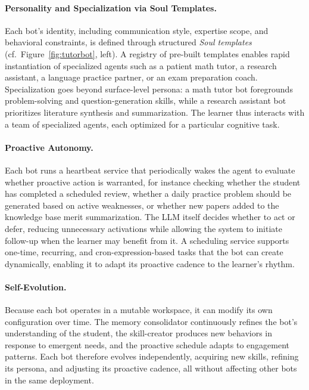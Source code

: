 \paragraph{Personality and Specialization via Soul Templates.}
Each bot's identity, including communication style, expertise scope, and behavioral constraints, is defined through structured \emph{Soul templates} (cf.\ Figure~\ref{fig:tutorbot}, left).
A registry of pre-built templates enables rapid instantiation of specialized agents such as a patient math tutor, a research assistant, a language practice partner, or an exam preparation coach.
Specialization goes beyond surface-level persona: a math tutor bot foregrounds problem-solving and question-generation skills, while a research assistant bot prioritizes literature synthesis and summarization.
The learner thus interacts with a team of specialized agents, each optimized for a particular cognitive task.

\paragraph{Proactive Autonomy.}
Each bot runs a heartbeat service that periodically wakes the agent to evaluate whether proactive action is warranted, for instance checking whether the student has completed a scheduled review, whether a daily practice problem should be generated based on active weaknesses, or whether new papers added to the knowledge base merit summarization.
The LLM itself decides whether to act or defer, reducing unnecessary activations while allowing the system to initiate follow-up when the learner may benefit from it.
A scheduling service supports one-time, recurring, and cron-expression-based tasks that the bot can create dynamically, enabling it to adapt its proactive cadence to the learner's rhythm.

\paragraph{Self-Evolution.}
Because each bot operates in a mutable workspace, it can modify its own configuration over time.
The memory consolidator continuously refines the bot's understanding of the student, the skill-creator produces new behaviors in response to emergent needs, and the proactive schedule adapts to engagement patterns.
Each bot therefore evolves independently, acquiring new skills, refining its persona, and adjusting its proactive cadence, all without affecting other bots in the same deployment.

